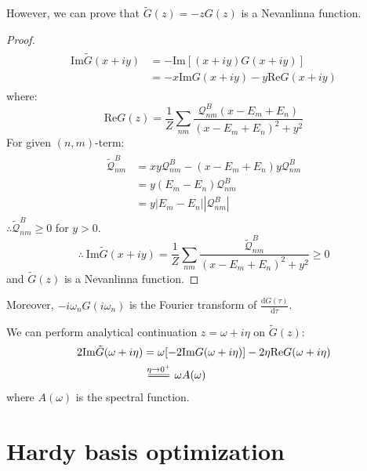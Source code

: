 \documentclass[
	preprint,%
	aps,
	prb,
	showpacs,	
	amsmath, amssymb]{revtex4-2}
\newcommand{\im}{ {\mathrm{Im}} }
\newcommand{\re}{ {\mathrm{Re}} }
\newcommand{\longeq}{\scalebox{3}[1]{=}}
\begin{document}
However, we can prove that $\tilde{G}(z) = -zG(z)$ is 
a Nevanlinna function.
\begin{proof}
	\begin{align}
	\begin{split}
		\im\tilde{G}(x + iy) &= -\im[(x + iy) G(x+iy)] \\
			&= -x\im G(x+iy) - y\re G(x+iy)
	\end{split}
	\end{align}
	where:
	\begin{equation}\label{eq:real-bose-GF}
		\re G(z) = \frac{1}{Z} \sum_{nm} 
			\frac{\mathcal{Q}^B_{nm}(x - E_m + E_n)}
			{(x - E_m + E_n)^2 + y^2}
	\end{equation}
	For given $(n,m)$-term:
	\begin{align}
	\begin{split}
		\tilde{\mathcal{Q}}^B_{nm} 
		&= xy\mathcal{Q}^B_{nm} - (x-E_m + E_n)y\mathcal{Q}^B_{nm} \\
		&= y(E_m - E_n)\mathcal{Q}^B_{nm} \\
		&= y|E_m - E_n||\mathcal{Q}^B_{nm}|
	\end{split}
	\end{align}
	$\therefore \tilde{\mathcal{Q}}^B_{nm} \geq 0$ for $y > 0$.
	\begin{equation}
		\therefore \ \im\tilde{G}(x + iy) = \frac{1}{Z} \sum_{nm} 
		\frac{\tilde{\mathcal{Q}}^B_{nm}}
		{(x - E_m + E_n)^2 + y^2} \geq 0
	\end{equation}
	and $\tilde{G}(z)$ is a Nevanlinna function.
\end{proof}
Moreover, $-i\omega_n G(i\omega_n)$ is the Fourier transform of 
$\frac{\mathrm{d}G(\tau)}{\mathrm{d} \tau}$.

We can perform analytical continuation $z=\omega + i\eta$ on $\tilde{G}(z)$:
\begin{align}
\begin{split}
	2\im \tilde{G}(\omega + i\eta)
	&= \omega[-2\im G(\omega + i\eta)] -2\eta\re G(\omega + i\eta)\\
	&\stackrel{\eta \to 0^+}{\longeq} \omega A(\omega)
\end{split}
\end{align}
where $A(\omega)$ is the spectral function.



\section{Hardy basis optimization}
\label{sec:hardy-basis-optimization}
\end{document}
